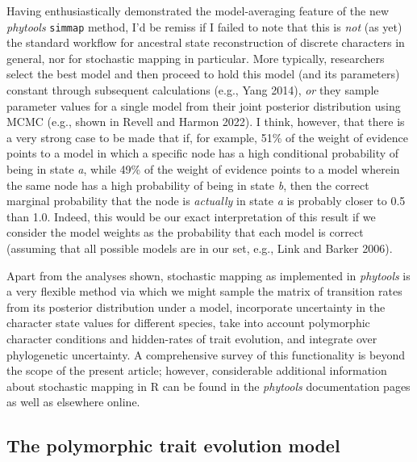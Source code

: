 \documentclass[fleqn,10pt,lineno]{wlpeerj} %
\begin{document}
Having enthusiastically demonstrated the model-averaging feature of the new \emph{phytools} \texttt{simmap} method, I'd be remiss if I failed to note that this is \emph{not} (as yet) the standard workflow for ancestral state reconstruction of discrete characters in general, nor for stochastic mapping in particular. More typically, researchers select the best model and then proceed to hold this model (and its parameters) constant through subsequent calculations (e.g., Yang 2014), \emph{or} they sample parameter values for a single model from their joint posterior distribution using MCMC (e.g., shown in Revell and Harmon 2022). I think, however, that there is a very strong case to be made that if, for example, 51\% of the weight of evidence points to a model in which a specific node has a high conditional probability of being in state \emph{a}, while 49\% of the weight of evidence points to a model wherein the same node has a high probability of being in state \emph{b}, then the correct marginal probability that the node is \emph{actually} in state \emph{a} is probably closer to 0.5 than 1.0. Indeed, this would be our exact interpretation of this result if we consider the model weights as the probability that each model is correct (assuming that all possible models are in our set, e.g., Link and Barker 2006).

Apart from the analyses shown, stochastic mapping as implemented in \emph{phytools} is a very flexible method via which we might sample the matrix of transition rates from its posterior distribution under a model, incorporate uncertainty in the character state values for different species, take into account polymorphic character conditions and hidden-rates of trait evolution, and integrate over phylogenetic uncertainty. A comprehensive survey of this functionality is beyond the scope of the present article; however, considerable additional information about stochastic mapping in R can be found in the \emph{phytools} documentation pages as well as elsewhere online.

\hypertarget{the-polymorphic-trait-evolution-model}{%
\subsection{The polymorphic trait evolution model}\label{the-polymorphic-trait-evolution-model}}
\end{document}

